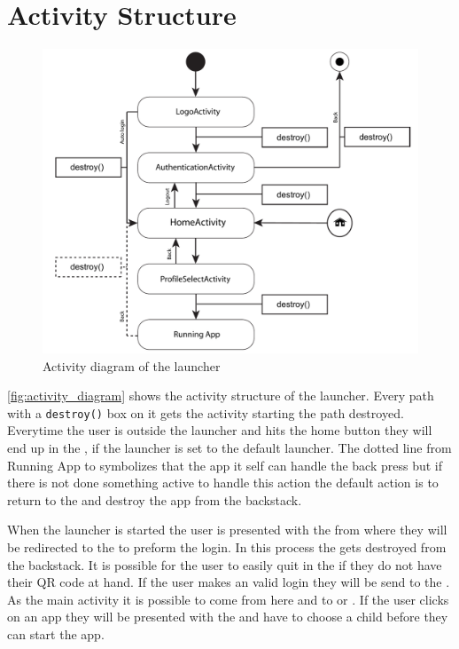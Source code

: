 \section{Activity Structure}
\label{implementation:activity_structure}
\begin{figure}[h!]
	\centering
	\includegraphics[width=1\textwidth]{gfx/activityDiagram.pdf}
	\caption{Activity diagram of the launcher}
	\label{fig:activity_diagram}
\end{figure}
\autoref{fig:activity_diagram} shows the activity structure of the \giraf[] launcher. Every path with a \verb+destroy()+ box on it gets the activity starting the path destroyed. Everytime the user is outside the launcher and hits the home button they will end up in the , if the \giraf[] launcher is set to the default launcher.
The dotted line from Running App to  symbolizes that the app it self can handle the back press but if there is not done something active to handle this action the default action is to return to the  and destroy the app from the backstack.

When the launcher is started the user is presented with the  from where they will be redirected to the  to preform the login. In this process the  gets destroyed from the backstack.
It is possible for the user to easily quit in the  if they do not have their QR code at hand. If the user makes an valid login they will be send to the . As the main activity it is possible to come from here and to  or . If the user clicks on an app they will be presented with the  and have to choose a child before they can start the app.


